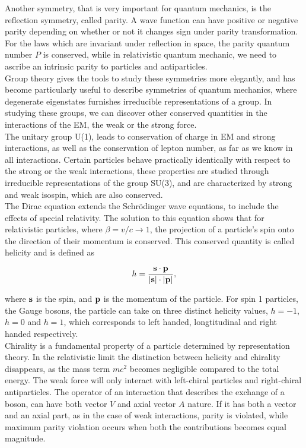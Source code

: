 \documentclass[12pt,a4paper]{article}
\numberwithin{equation}{section}
\begin{document}
Another symmetry, that is very important for quantum mechanics, is the
reflection symmetry, called parity. A wave function can have positive or
negative parity depending on whether or not it changes sign under parity
transformation. For the laws which are invariant under reflection in space, the
parity quantum number $P$ is conserved, while in relativistic quantum mechanic,
we need to ascribe an intrinsic parity to particles and antiparticles.\\

Group theory gives the tools to study these symmetries more elegantly, and has
become particularly useful to describe symmetries of quantum mechanics, where
degenerate eigenstates furnishes irreducible representations of a group. In
studying these groups, we can discover other conserved quantities in the
interactions of the EM, the weak or the strong force.\\

The unitary group U(1), leads to conservation of charge in EM and strong
interactions, as well as the conservation of lepton number, as far as
we know in all interactions. Certain particles behave practically identically
with respect to the strong or the weak interactions, these properties are
studied through irreducible representations of the group SU(3), and are
characterized by strong and weak isospin, which are also conserved.\\

The Dirac equation extends the Schrödinger wave equations, to include the
effects of special relativity. The solution to this equation shows that for
relativistic particles, where $\beta = v/c \rightarrow 1$, the projection of a particle's spin
onto the direction of their momentum is conserved. This conserved quantity is
called helicity\cite[63]{Povh2015} and is defined as

\begin{equation}
  h = \frac{\vb{s \cdot p}}{\abs{\vb s} \cdot \abs{\vb p}},
\end{equation}

where $\vb s$ is the  spin, and $\vb p$ is the momentum of the particle. For
spin 1 particles, the Gauge bosons, the particle can take on three distinct
helicity values, $h=-1$, $h=0$ and $h=1$, which corresponds to left handed,
longtitudinal and right handed respectively.\\

Chirality is a fundamental property of a particle determined by representation
theory. In the relativistic limit the distinction between helicity and chirality
disappears, as the mass term $mc^2$ becomes negligible compared to the total
energy. The weak force will only interact with left-chiral particles and
right-chiral antiparticles. The operator of an interaction that describes the
exchange of a boson, can have both vector $V$ and axial vector $A$ nature. If it
has both a vector and an axial part, as in the case of weak interactions, parity
is violated, while maximum parity violation occurs when both the contributions
becomes equal magnitude.\\
\end{document}
